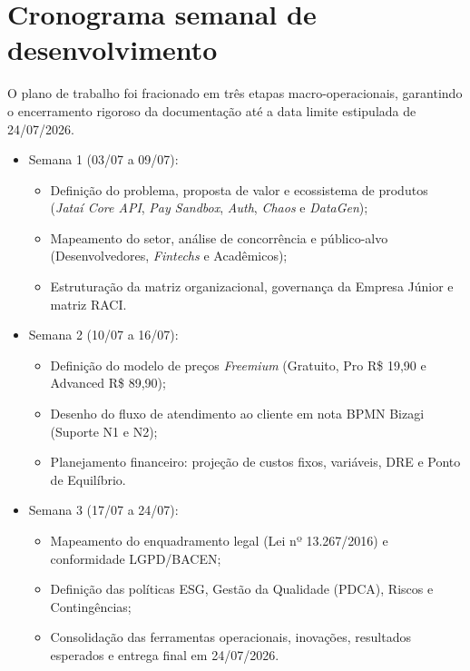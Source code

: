 \documentclass[
  12pt,
  openright,
  oneside,
  a4paper,
  brazilian
]{abntex2}
\begin{document}
\section{Cronograma semanal de desenvolvimento}
\label{sec:cronograma_semanal}

O plano de trabalho foi fracionado em três etapas macro-operacionais, garantindo o encerramento rigoroso da documentação até a data limite estipulada de 24/07/2026.

\begin{itemize}
    \item{Semana 1 (03/07 a 09/07):}
    \begin{itemize}
        \item Definição do problema, proposta de valor e ecossistema de produtos (\textit{Jataí Core API}, \textit{Pay Sandbox}, \textit{Auth}, \textit{Chaos} e \textit{DataGen});
        \item Mapeamento do setor, análise de concorrência e público-alvo (Desenvolvedores, \textit{Fintechs} e Acadêmicos);
        \item Estruturação da matriz organizacional, governança da Empresa Júnior e matriz RACI.
    \end{itemize}
    
    \item{Semana 2 (10/07 a 16/07):}
    \begin{itemize}
        \item Definição do modelo de preços \textit{Freemium} (Gratuito, Pro R\$ 19,90 e Advanced R\$ 89,90);
        \item Desenho do fluxo de atendimento ao cliente em nota BPMN Bizagi (Suporte N1 e N2);
        \item Planejamento financeiro: projeção de custos fixos, variáveis, DRE e Ponto de Equilíbrio.
    \end{itemize}
    
    \item{Semana 3 (17/07 a 24/07):}
    \begin{itemize}
        \item Mapeamento do enquadramento legal (Lei nº 13.267/2016) e conformidade LGPD/BACEN;
        \item Definição das políticas ESG, Gestão da Qualidade (PDCA), Riscos e Contingências;
        \item Consolidação das ferramentas operacionais, inovações, resultados esperados e entrega final em 24/07/2026.
    \end{itemize}
\end{itemize}
\end{document}
